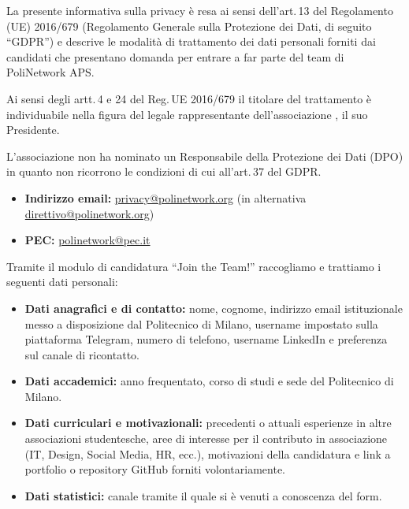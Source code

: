 \documentclass[legal]{core/polinetwork}
\begin{document}
\thispagestyle{firstpage}

\pnMakeHeader
\pnMakeMetadata


La presente informativa sulla privacy è resa ai sensi dell'art.\,13 del
Regolamento (UE) 2016/679 (Regolamento Generale sulla Protezione dei Dati,
di seguito ``GDPR'') e descrive le modalità di trattamento dei dati
personali forniti dai candidati che presentano domanda per entrare a far
parte del team di PoliNetwork APS.


Ai sensi degli artt.\,4 e 24 del Reg.\,UE 2016/679 il titolare del
trattamento è individuabile nella figura del legale rappresentante
dell'associazione , il suo Presidente.

L'associazione non ha nominato un Responsabile della Protezione dei Dati
(DPO) in quanto non ricorrono le condizioni di cui all'art.\,37 del GDPR.


\begin{itemize}
  \item \textbf{Indirizzo email:}
    \href{mailto:privacy@polinetwork.org}{privacy@polinetwork.org}
    (in alternativa
    \href{mailto:direttivo@polinetwork.org}{direttivo@polinetwork.org})
  \item \textbf{PEC:}
    \href{mailto:polinetwork@pec.it}{polinetwork@pec.it}
\end{itemize}


Tramite il modulo di candidatura ``Join the Team!'' raccogliamo e
trattiamo i seguenti dati personali:

\begin{itemize}
  \item \textbf{Dati anagrafici e di contatto:} nome, cognome, indirizzo
    email istituzionale messo a disposizione dal Politecnico di Milano,
    username impostato sulla piattaforma Telegram, numero di telefono,
    username LinkedIn e preferenza sul canale di ricontatto.
  \item \textbf{Dati accademici:} anno frequentato, corso di studi e sede
    del Politecnico di Milano.
  \item \textbf{Dati curriculari e motivazionali:} precedenti o attuali
    esperienze in altre associazioni studentesche, aree di interesse per
    il contributo in associazione (IT, Design, Social Media, HR, ecc.),
    motivazioni della candidatura e link a portfolio o repository GitHub
    forniti volontariamente.
  \item \textbf{Dati statistici:} canale tramite il quale si è venuti a
    conoscenza del form.
\end{itemize}
\end{document}
